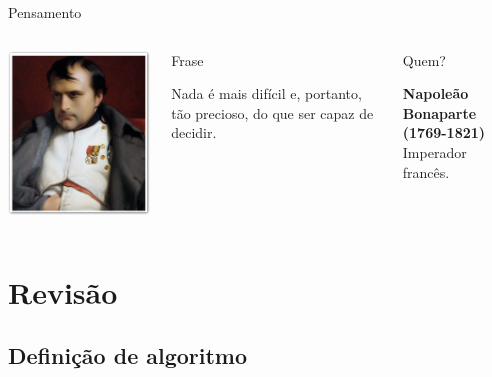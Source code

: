 \documentclass[xcolor=dvipsnames,table]{beamer}
\begin{document}
	\begin{frame}{Pensamento}
		\begin{columns}
		  		\begin{center}
		    		\includegraphics[height=.6\textheight]{images/bonaparte.jpg}
		  		\end{center}
				\begin{block}{Frase}
					\begin{center}
						{\large Nada é mais difícil e, portanto, tão precioso, do que ser capaz de decidir.}
					\end{center}
				\end{block}		  		
		  		\begin{block}{Quem?}
		  			\begin{center}
						{\bf Napoleão Bonaparte (1769-1821)} \\ Imperador francês.
					\end{center}
				\end{block}
		\end{columns}
	\end{frame}
	

\section{Revisão}
	\subsection{Definição de algoritmo}	
	
\end{document}
